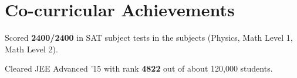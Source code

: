 \documentclass[a4paper,20pt]{article}
\makeatletter
\newcommand{\resumeSubheading}[4]{
  \vspace{-1pt}\item
    \begin{tabular*}{0.97\textwidth}{l@{\extracolsep{\fill}}r}
      \textbf{#1} & #2 \\
      \textit{#3} & \textit{#4} \\
    \end{tabular*}\vspace{-5pt}
}
\newcommand{\resumeSubHeadingListStart}{\begin{itemize}[leftmargin=*]}
\newcommand{\resumeSubHeadingListEnd}{\end{itemize}}
\makeatother
\begin{document}
\section{Co-curricular Achievements}
\begin{description}[font=$\bullet$]
\item {Scored \textbf{2400/2400} in SAT subject tests in the subjects (Physics, Math Level 1, Math Level 2). }
\vspace{-5pt}
\item {Cleared JEE Advanced '15 with rank \textbf{4822} out of about 120,000 students.}

\end{description}
% 

\end{document}

